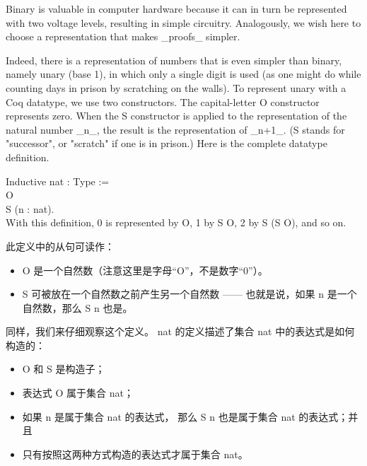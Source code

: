 \documentclass[utf8]{ctexart}
\providecommand{\tightlist}{%
  \setlength{\itemsep}{0pt}\setlength{\parskip}{0pt}}
\begin{document}
Binary is valuable in computer hardware because it can in turn be
represented with two voltage levels, resulting in simple circuitry.
Analogously, we wish here to choose a representation that makes
\_proofs\_ simpler.

Indeed, there is a representation of numbers that is even simpler than
binary, namely unary (base 1), in which only a single digit is used (as
one might do while counting days in prison by scratching on the walls).
To represent unary with a Coq datatype, we use two constructors. The
capital-letter {{O}} constructor represents zero. When the {{S}}
constructor is applied to the representation of the natural number
\_n\_, the result is the representation of \_n+1\_. ({{S}} stands for
"successor", or "scratch" if one is in prison.) Here is the complete
datatype definition.

{Inductive} {nat} : {Type} :=\\
\hspace*{0.333em}\hspace*{0.333em}\textbar{} {O}\\
\hspace*{0.333em}\hspace*{0.333em}\textbar{} {S} ({n} : {nat}).\\

With this definition, 0 is represented by {{O}}, 1 by {{S}} {{O}}, 2 by
{{S}} {({S}} {{O})}, and so on.

此定义中的从句可读作：

\begin{itemize}
\tightlist
\item
  {{O}} 是一个自然数（注意这里是字母``{{O}}''，不是数字``{0}''）。
\item
  {{S}} 可被放在一个自然数之前产生另一个自然数 ------ 也就是说，如果
  {{n}} 是一个自然数，那么 {{S}} {{n}} 也是。
\end{itemize}

同样，我们来仔细观察这个定义。 {{nat}} 的定义描述了集合 {{nat}}
中的表达式是如何构造的：

\begin{itemize}
\tightlist
\item
  {{O}} 和 {{S}} 是构造子；
\item
  表达式 {{O}} 属于集合 {{nat}}；
\item
  如果 {{n}} 是属于集合 {{nat}} 的表达式， 那么 {{S}} {{n}} 也是属于集合
  {{nat}} 的表达式；并且
\item
  只有按照这两种方式构造的表达式才属于集合 {{nat}}。
\end{itemize}
\end{document}
